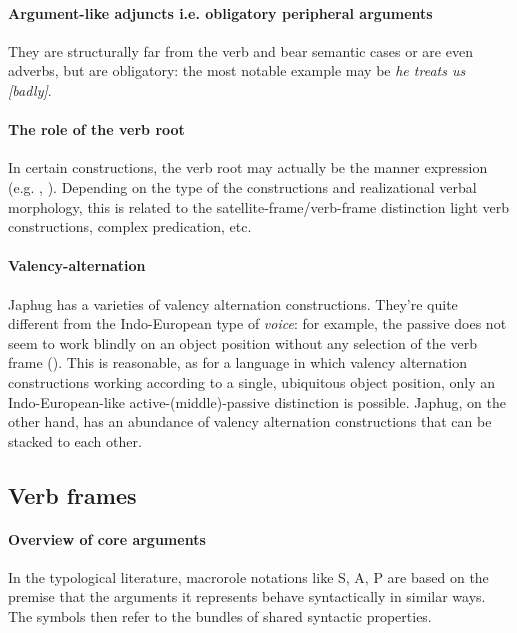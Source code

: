 \documentclass[a4paper, oneside, 12pt]{report}
\newcommand*{\term}[1]{\emph{#1}}
\newcommand{\form}[1]{\emph{#1}}
\begin{document}
\paragraph*{Argument-like adjuncts i.e. obligatory peripheral arguments}
They are structurally far from the verb
and bear semantic cases or are even adverbs,
but are obligatory:
the most notable example may be \form{he treats us [badly]}.

\paragraph*{The role of the verb root}
In certain constructions,
the verb root may actually be the manner expression
(e.g. \citealt{acedo2013satellite}, \citealt{punske2013three}).
Depending on the type of the constructions and realizational verbal morphology,
this is related to the satellite-frame/verb-frame distinction
light verb constructions, complex predication, etc.

\paragraph*{Valency-alternation}\label{sec:grammatical.clause.internal.valency}
Japhug has a varieties of valency alternation constructions.
They're quite different from the Indo-European type of \term{voice}: 
for example, the passive does not seem to work blindly on an object position
without any selection of the verb frame
().
This is reasonable,
as for a language in which valency alternation constructions 
working according to a single, ubiquitous object position,
only an Indo-European-like active-(middle)-passive distinction is possible.
Japhug, on the other hand, has an abundance of valency alternation constructions
that can be stacked to each other.

\subsection{Verb frames}\label{sec:grammatical.clause.frames}

\paragraph*{Overview of core arguments}
In the typological literature, macrorole notations like S, A, P 
are based on the premise that the arguments it represents
behave syntactically in similar ways.
The symbols then refer to the bundles of shared syntactic properties.
\end{document}
